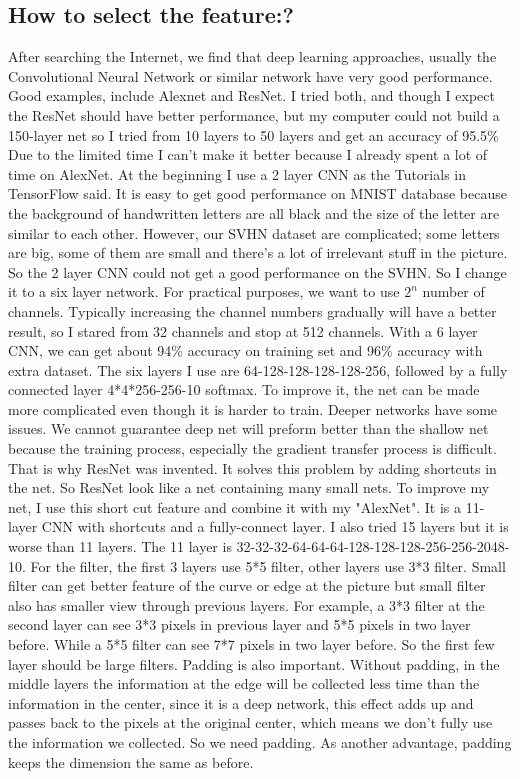 \documentclass[twocolumn]{webofc}
\begin{document}
\subsection{How to select the feature:?}\label{sec:formatting}
After searching the Internet, we find that deep learning approaches, usually the Convolutional Neural Network\cite{Krizhevsky2012b,Ciresan2011} or similar network have very good performance. Good examples, include Alexnet and ResNet. I tried both, and though I expect the ResNet\cite{Szegedy} should have better performance, but my computer could not build a 150-layer net so I tried from 10 layers to 50 layers and get an accuracy of 95.5\% Due to the limited time I can't make it better because I already spent a lot of time on AlexNet. 
At the beginning I use a 2 layer CNN as the Tutorials in TensorFlow said. It is easy to get good performance on MNIST database because the background of handwritten letters are all black and the size of the letter are similar to each other. However, our SVHN dataset are complicated; some letters are big, some of them are small and there's a lot of irrelevant stuff in the picture. So the 2 layer CNN could not get a good performance on the SVHN. So I change it to a six layer network. For practical purposes, we want to use $2^n$ number of channels. Typically increasing the channel numbers gradually will have a better result, so I stared from 32 channels and stop at 512 channels. 
With a 6 layer CNN, we can get about 94\% accuracy on training set and 96\% accuracy with extra dataset. 
The six layers I use are 64-128-128-128-128-256, followed by a fully connected layer 4*4*256-256-10 softmax.
To improve it, the net can be made more complicated even though it is harder to train. 
Deeper networks have some issues. We cannot guarantee deep net will preform better than the shallow net because the training process, especially the gradient transfer process is difficult. That is why ResNet was invented. It solves this problem by adding shortcuts in the net. So ResNet look like a net containing many small nets. To improve my net, I use this short cut feature and combine it with my "AlexNet". It is a 11-layer CNN with shortcuts and a fully-connect layer. I also tried 15 layers but it is worse than 11 layers. 
The 11 layer is 32-32-32-64-64-64-128-128-128-256-256-2048-10. For the filter, the first 3  layers use 5*5 filter, other layers use 3*3 filter. Small filter can get better feature of the curve or edge at the picture but small filter also has smaller view through previous layers. For example, a 3*3 filter at the second layer can see 3*3 pixels in previous layer and 5*5 pixels in two layer before. While a 5*5 filter can see 7*7 pixels in two layer before. So the first few layer should be large filters.
Padding is also important. Without padding, in the middle layers the information at the edge will be collected less time than the information in the center, since it is a deep network, this effect adds up and passes back to the pixels at the original center, which means we don't fully use the information we collected. So we need padding. As another advantage, padding keeps the dimension the same as before. 
\end{document}
